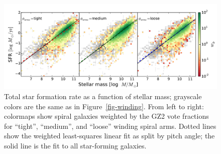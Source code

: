 \documentclass{emulateapj}
\begin{document}
\appendix
\begin{figure}
\includegraphics[angle=0,width=7.0in]{figures/ms_arms_winding_weighted.pdf}
\caption{Total star formation rate as a function of stellar mass; grayscale colors are the same as in Figure~\ref{fig-winding}. From left to right: colormaps show spiral galaxies weighted by the GZ2 vote fractions for ``tight'', ``medium'', and ``loose'' winding spiral arms. Dotted lines show the weighted least-squares linear fit as split by pitch angle; the solid line is the fit to all star-forming galaxies. 
\label{fig-winding_weighted}}
\end{figure}
\end{document}
